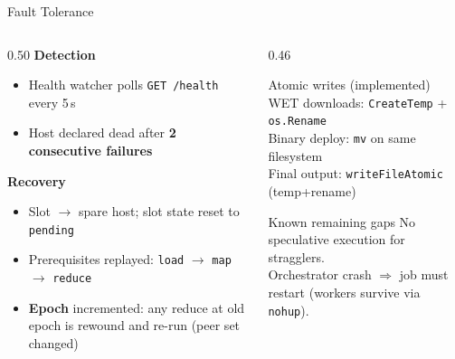 \documentclass[aspectratio=169,10pt]{beamer}
\begin{document}
\begin{frame}{Fault Tolerance}
  \begin{columns}[T,onlytextwidth]
    \begin{column}{0.50\textwidth}
      \textbf{Detection}
      \begin{itemize}
        \item Health watcher polls \texttt{GET /health} every 5\,s
        \item Host declared dead after \textbf{2 consecutive failures}
      \end{itemize}
      \textbf{Recovery}
      \begin{itemize}
        \item Slot $\to$ spare host; slot state reset to \texttt{pending}
        \item Prerequisites replayed: \texttt{load} $\to$ \texttt{map} $\to$ \texttt{reduce}
        \item \textbf{Epoch} incremented: any reduce at old epoch is rewound and re-run (peer set changed)
      \end{itemize}
    \end{column}
    \begin{column}{0.46\textwidth}
      \begin{block}{Atomic writes (implemented)}
        WET downloads: \texttt{CreateTemp} + \texttt{os.Rename}\\
        Binary deploy: \texttt{mv} on same filesystem\\
        Final output: \texttt{writeFileAtomic} (temp+rename)
      \end{block}
      \begin{block}{Known remaining gaps}
        No speculative execution for stragglers.\\
        Orchestrator crash $\Rightarrow$ job must restart (workers survive via \texttt{nohup}).
      \end{block}
    \end{column}
  \end{columns}
\end{frame}
\end{document}
